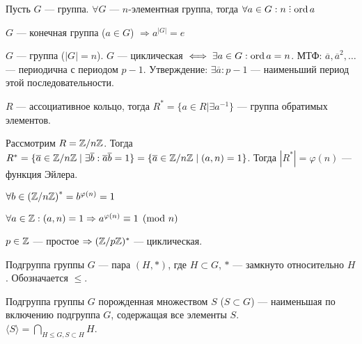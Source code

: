 \begin{theorem}
    Пусть $G$ --- группа.  $\forall G$ ---  $n$-элементная группа, тогда  $\forall a \in G: n \divby \ord a$
\end{theorem}
\begin{consequence}
    $G$ --- конечная группа ($a \in G$) $\Rightarrow a^{|G|} = e$
\end{consequence}
\begin{statement}
    $G$ --- группа ($|G|=n$). $G$ --- циклическая  $\iff \exists a \in G: \operatorname{ord} a = n$.  
    МТФ: $\overline{a}, \overline{a}^2,\ldots$ --- периодична с периодом $p-1$. Утверждение:  $\exists \overline{a}: p-1$ --- наименьший период этой последовательности.
\end{statement}
\begin{definition}
    $R$ --- ассоциативное кольцо, тогда  $R^* = \{a \in R | \exists a^{-1}\}$ --- группа обратимых элементов.
\end{definition}
\begin{definition}
Рассмотрим $R = \mathbb{Z} / n\mathbb{Z}$. Тогда  $R^* = \{ \overline{a} \in \mathbb{Z} / n\mathbb{Z} \mid \exists \overline{b}: \overline{a} \overline{b} = 1\} = \{\overline{a} \in \mathbb{Z} / n\mathbb{Z} \mid (a, n) = 1\}$. Тогда $|R^*| = \varphi(n)$ --- функция Эйлера.
\end{definition}
 \begin{theorem}
     $\forall b \in \left(\mathbb{Z} / n\mathbb{Z}\right)^* = b^{\varphi(n)} = 1$
\end{theorem}
\begin{theorem}
    $\forall a \in \mathbb{Z}: (a, n) = 1 \Rightarrow a^{\varphi(n)} \equiv 1 \pmod{n}$ 
\end{theorem}
 \begin{theorem}
     $p \in \mathbb{Z}$ --- простое  $\Rightarrow (\mathbb{Z} / p\mathbb{Z})^*$ --- циклическая.
 \end{theorem}
 \begin{definition}
     Подгруппа группы $G$ --- пара  $(H, \ast)$, где  $H \subset G$,  $\ast$ --- замкнуто относительно $H$. Обозначается $\le$.
 \end{definition}
 \begin{definition}
     Подгруппа группы $G$ порожденная множеством  $S$  ($S \subset G$) --- наименьшая по включению подгруппа $G$, содержащая все элементы  $S$.\\
     $\langle S \rangle = \displaystyle \bigcap_{H \le G, S \subset H} H$.\\
 \end{definition}
